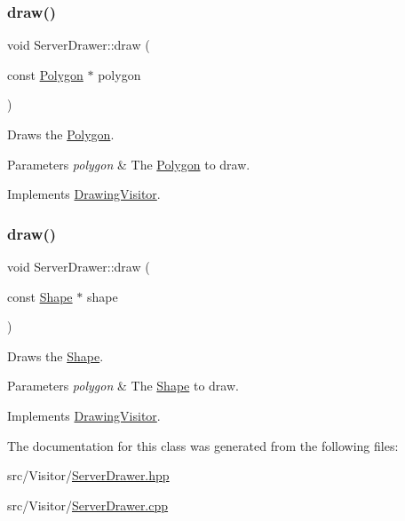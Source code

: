 \subsubsection{\texorpdfstring{draw()}{draw()}\hspace{0.1cm}{\footnotesize\ttfamily [4/5]}}
{\footnotesize\ttfamily void Server\+Drawer\+::draw (\begin{DoxyParamCaption}\item[{const \hyperlink{class_polygon}{Polygon} $\ast$}]{polygon }\end{DoxyParamCaption})\hspace{0.3cm}{\ttfamily [virtual]}}

Draws the \hyperlink{class_polygon}{Polygon}. 
\begin{DoxyParams}{Parameters}
{\em polygon} & The \hyperlink{class_polygon}{Polygon} to draw. \\
\hline
\end{DoxyParams}


Implements \hyperlink{class_drawing_visitor_a771a2110a3afe4e87688bddd65657a46}{Drawing\+Visitor}.

\hypertarget{class_server_drawer_a071fa49ab9edc71554b32aaaf7422b7f}{}\label{class_server_drawer_a071fa49ab9edc71554b32aaaf7422b7f} 
\subsubsection{\texorpdfstring{draw()}{draw()}\hspace{0.1cm}{\footnotesize\ttfamily [5/5]}}
{\footnotesize\ttfamily void Server\+Drawer\+::draw (\begin{DoxyParamCaption}\item[{const \hyperlink{class_shape}{Shape} $\ast$}]{shape }\end{DoxyParamCaption})\hspace{0.3cm}{\ttfamily [virtual]}}

Draws the \hyperlink{class_shape}{Shape}. 
\begin{DoxyParams}{Parameters}
{\em polygon} & The \hyperlink{class_shape}{Shape} to draw. \\
\hline
\end{DoxyParams}


Implements \hyperlink{class_drawing_visitor_ad3d9e3028449f65ea2c405c74c4a55b4}{Drawing\+Visitor}.



The documentation for this class was generated from the following files\+:\begin{DoxyCompactItemize}
\item 
src/\+Visitor/\hyperlink{_server_drawer_8hpp}{Server\+Drawer.\+hpp}\item 
src/\+Visitor/\hyperlink{_server_drawer_8cpp}{Server\+Drawer.\+cpp}\end{DoxyCompactItemize}
